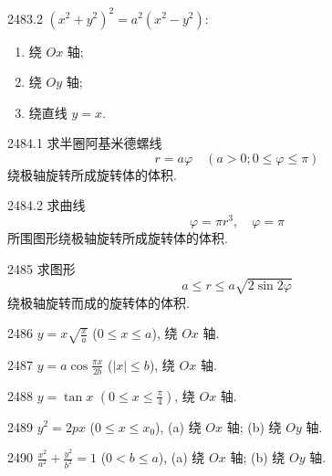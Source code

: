 \begin{prob}[L]{2483.2}
$(x^2 + y^2)^2 = a^2(x^2 - y^2)$:
\begin{enumerate}[label=(\alph*), itemsep=2pt, topsep=3pt]
\item 绕 $Ox$ 轴;
\item 绕 $Oy$ 轴;
\item 绕直线 $y = x$.
\end{enumerate}
\end{prob}

\begin{prob}[M]{2484.1}
求半圈阿基米德螺线
\[
r = a\varphi \quad (a > 0; 0 \leqslant \varphi \leqslant \pi)
\]
绕极轴旋转所成旋转体的体积.
\end{prob}

\begin{prob}[M]{2484.2}
求曲线
\[
\varphi = \pi r^3, \quad \varphi = \pi
\]
所围图形绕极轴旋转所成旋转体的体积.
\end{prob}

\begin{prob}[M]{2485}
求图形
\[
a \leqslant r \leqslant a\sqrt{2\sin 2\varphi}
\]
绕极轴旋转而成的旋转体的体积.
\end{prob}



\begin{prob}[S]{2486}
$y = x\sqrt{\frac{x}{a}}$ ($0 \leqslant x \leqslant a$), 绕 $Ox$ 轴.
\end{prob}

\begin{prob}[S]{2487}
$y = a\cos\frac{\pi x}{2b}$ ($|x| \leqslant b$), 绕 $Ox$ 轴.
\end{prob}

\begin{prob}[S]{2488}
$y = \tan x$ $\left(0 \leqslant x \leqslant \frac{\pi}{4}\right)$, 绕 $Ox$ 轴.
\end{prob}

\begin{prob}[M]{2489}
$y^2 = 2px$ ($0 \leqslant x \leqslant x_0$), (a) 绕 $Ox$ 轴; \qquad (b) 绕 $Oy$ 轴.
\end{prob}

\begin{prob}[M]{2490}
$\frac{x^2}{a^2} + \frac{y^2}{b^2} = 1$ ($0 < b \leqslant a$), (a) 绕 $Ox$ 轴; \qquad (b) 绕 $Oy$ 轴.
\end{prob}

